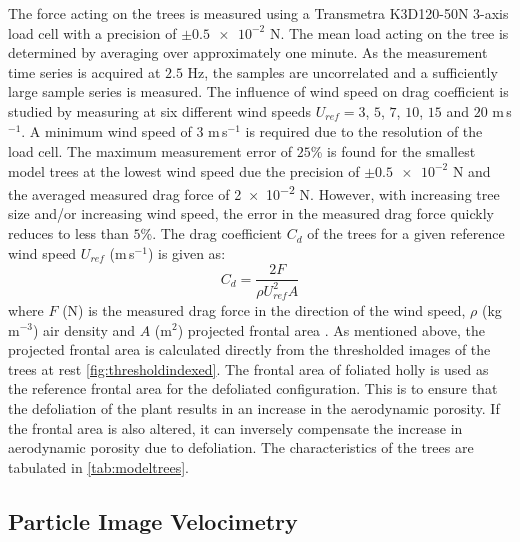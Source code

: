 The force acting on the trees is measured using a Transmetra K3D120-50N 3-axis load cell with a precision of $\pm \num{0.5e-2}$ N. The mean load acting on the tree is determined by averaging over approximately one minute. As the measurement time series is acquired at $2.5$ Hz, the samples are uncorrelated and a sufficiently large sample series is measured. The influence of wind speed on drag coefficient is studied by measuring at six different wind speeds $U_{\textit{ref}} = 3$, $5$, $7$, $10$, $15$ and $20$ m\,s$^{-1}$. A minimum wind speed of $3$ m\,s$^{-1}$ is required due to the resolution of the load cell. The maximum measurement error of $25$\% is found for the smallest model trees at the lowest wind speed due the precision of $\pm \num{0.5e-2}$ N and the averaged measured drag force of \num{2e-2} N. However, with increasing tree size and/or increasing wind speed, the error in the measured drag force quickly reduces to less than $5$\%. The drag coefficient $C_d$ of the trees for a given reference wind speed $U_{\textit{ref}}$ (m\,s$^{-1}$) is given as:
\begin{equation}
C_d = \frac{2F}{\rho U_{\textit{ref}}^2 A}
\label{eq:dragcoefficient}
\end{equation}
where $F$ (N) is the measured drag force in the direction of the wind speed, $\rho$ (kg\,m$^{-3}$) air density and $A$ (m$^{2}$) projected frontal area \citep{Grant1998,Guan2003,Mayhead1973}. As mentioned above, the projected frontal area is calculated directly from the thresholded images of the trees at rest \cref{fig:thresholdindexed}. The frontal area of foliated holly is used as the reference frontal area for the defoliated configuration. This is to ensure that the defoliation of the plant results in an increase in the aerodynamic porosity. If the frontal area is also altered, it can inversely compensate the increase in aerodynamic porosity due to defoliation. The characteristics of the trees are tabulated in \cref{tab:modeltrees}.

\subsection{Particle Image Velocimetry}


